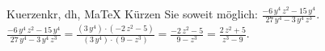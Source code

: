 \begin{MAufgabe}{Kuerzen}{kr, dh, MaTeX}
K\"urzen Sie soweit m\"oglich: $\frac{ - 6\, y^4\, z^2 - 15\, y^4}{27\, y^4 - 3\, y^4\, z^3}$.\\ 
\ifLsg\MLoesung
\quad $\frac{ - 6\, y^4\, z^2 - 15\, y^4}{27\, y^4 - 3\, y^4\, z^3}=\frac{(3\, y^4)\cdot( - 2\, z^2 - 5)}{(3\, y^4)\cdot(9 - z^3)}=\frac{ - 2\, z^2 - 5}{9 - z^3}=\frac{2\, z^2 + 5}{z^3 - 9}$.\else\relax\fi
 \end{MAufgabe}